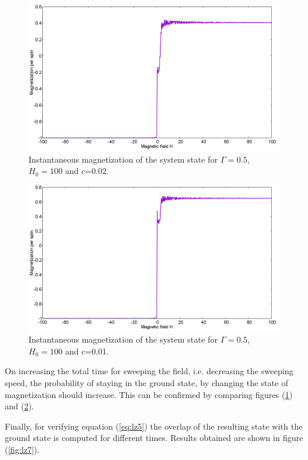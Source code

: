 \documentclass[12]{article}
\begin{document}
\begin{figure}[H]
  \centering
    \includegraphics[scale=0.3]{Mag_13_H100.png}
    \caption{Instantaneous magnetization of the system state for $\Gamma=0.5$, $H_0=100$ and c=0.02.}
  \label{fig:lz5}
 \end{figure}
 \begin{figure}[H]
    \includegraphics[scale=0.3]{Mag_9_H100.png}
    \caption{Instantaneous magnetization of the system state for $\Gamma=0.5$, $H_0=100$ and c=0.01.}
  \label{fig:lz6}
\end{figure}
On increasing the total time for sweeping the field, i.e. decreasing the sweeping speed, the probability of staying in the ground state, by changing the state of magnetization should increase. This can be confirmed by comparing figures (\ref{fig:lz5}) and (\ref{fig:lz6}).

Finally, for verifying equation ({\ref{eq:lz5}}) the overlap of the resulting state with the ground state is computed for different times. Results obtained are shown in figure (\ref{fig:lz7}). 
\end{document}
